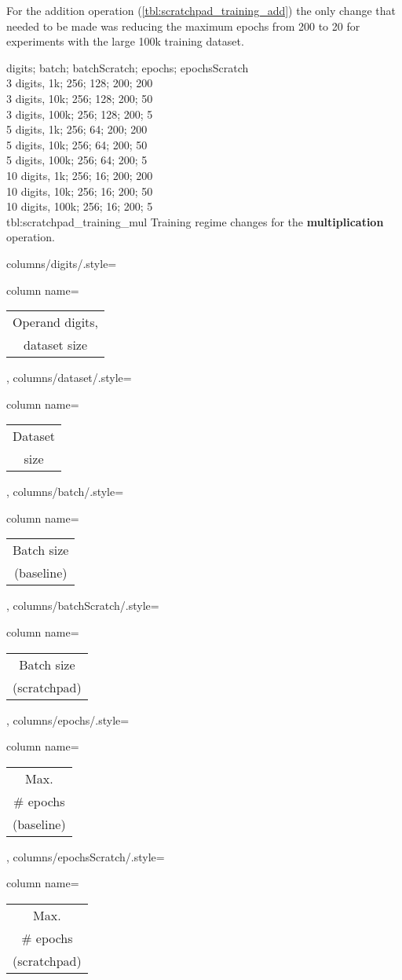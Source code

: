 For the addition operation (\cref{tbl:scratchpad_training_add}) the only change that needed to be made was reducing the maximum epochs from 200 to 20 for experiments with the large 100k training dataset.

{
	digits; batch; batchScratch; epochs; epochsScratch\\
	3 digits,  1k;  256; 128; 200; 200\\
	3 digits,  10k;  256; 128; 200; 50\\
	3 digits,  100k;  256; 128; 200; 5\\
	5 digits,  1k;  256; 64; 200; 200\\
	5 digits,  10k;  256; 64; 200; 50\\
	5 digits,  100k;  256; 64; 200; 5\\
	10 digits,  1k;  256; 16; 200; 200\\
	10 digits,  10k;  256; 16; 200; 50\\
	10 digits,  100k;  256; 16; 200; 5\\
}
{tbl:scratchpad_training_mul}
{
	Training regime changes for the \textbf{multiplication} operation.
}
{%
	columns/digits/.style={column name={\begin{tabular}{c}
				Operand digits, \\
				dataset size
	\end{tabular}}},
	columns/dataset/.style={column name={\begin{tabular}{c}
				Dataset \\
				size
	\end{tabular}}},
	columns/batch/.style={column name={\begin{tabular}{c}
				Batch size \\
				(baseline)
	\end{tabular}}},
	columns/batchScratch/.style={column name={\begin{tabular}{c}
				Batch size \\
				(scratchpad)
	\end{tabular}}},
	columns/epochs/.style={column name={\begin{tabular}{c}
				Max. \\
				\# epochs \\
				(baseline)
	\end{tabular}}},
	columns/epochsScratch/.style={column name={\begin{tabular}{c}
				Max. \\
				\# epochs \\
				(scratchpad)
	\end{tabular}}}
}

